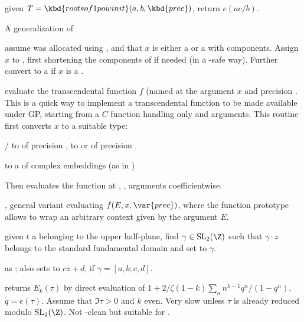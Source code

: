  given
$T = \kbd{rootsof1powinit}(a,b,\kbd{prec})$, return $e(ac/b)$.


\noindent A generalization of 

 assume  was allocated using
, and that $x$ is either a  or a 
with  components. Assign $x$ to , first shortening
the components of  if needed (in a -safe way). Further
convert  to a  if $x$ is a .

evaluate the transcendental function $f$ (named  at the argument
$x$ and precision . This is a quick way to implement a transcendental
function to be made available under GP, starting from a $C$ function
handling only  and  arguments. This routine first
converts $x$ to a suitable type:

\item {}/ to  of precision ,  to
 or  of precision .

\item {} to a  of complex embeddings (as in )

Then evaluates the function at , ,  arguments
coefficientwise.

, general variant evaluating $f(E, x, \var{prec})$, where the
function prototype allows to wrap an arbitrary context given by the argument
$E$.


 given $t$ a  belonging to the
upper half-plane, find $\gamma \in \text{SL}_2(\Z)$ such that $\gamma \cdot z$
belongs to the standard fundamental domain and set  to $\gamma$.

 as ; also sets
 to $cz + d$, if $\gamma = [a,b;c,d]$.

 returns $E_k(\tau)$ by direct
evaluation of $1 + 2/\zeta(1-k) \sum_n n^{k-1} q^n/(1-q^n)$, $q = e(\tau)$.
Assume that $\Im \tau > 0$ and $k$ even. Very slow unless $\tau$ is already
reduced modulo $\text{SL}_2(\Z)$. Not -clean but suitable for
.

